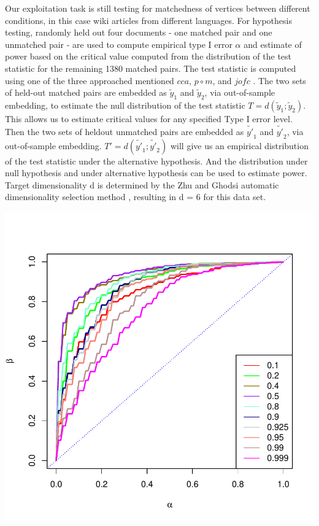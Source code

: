 \documentclass[11pt]{article} %
\begin{document}
Our exploitation task is still testing for matchedness of vertices between different conditions, in this case wiki articles from different languages.
For hypothesis testing,   randomly held out four documents - one matched pair and one unmatched pair
 -  are used to compute empirical type I error $\alpha$ and estimate of power based on the critical value computed
  from the distribution of the test statistic for the remaining 1380 matched pairs. 
The test statistic is computed using one of the three approached mentioned  $cca$, $p\circ m$, and $jofc$ . 
The two sets of held-out matched pairs are embedded as $\tilde{y}_1$ and $\tilde{y}_2$, via out-of-sample
embedding, to estimate the null distribution of the test statistic $T = d(\tilde{y}_1; \tilde{y}_2)$. This allows
us to estimate critical values for any specified Type I error level. 
Then the two sets of heldout unmatched pairs are embedded as $\tilde{y'}_1$ and $\tilde{y'}_2$, via out-of-sample embedding. 
$T' = d(\tilde{y'}_1; \tilde{y'}_2)$ will give us an empirical distribution of the test statistic  under the alternative hypothesis. 
And the distribution under null hypothesis and under alternative hypothesis can be used to estimate power.
Target dimensionality d is determined by the Zhu and Ghodsi  automatic dimensionality selection
method \cite{ZhuGhodsi}, resulting in d = 6 for this data set.



\includegraphics{FidCommPaper-wiki-2cond-plot}
\end{document}
